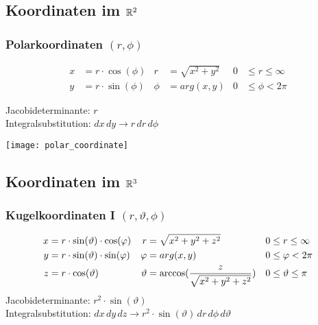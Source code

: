 \subsection{Koordinaten im $\R^2$}
\subsubsection{Polarkoordinaten $(r, \phi)$}
\begin{align*}
	x &= r \cdot \cos(\phi) &  r &= \sqrt{x^2 + y^2} & 0 &\leq r \leq \infty\\
	y &= r \cdot \sin(\phi) &  \phi &= arg(x, y) & 0 &\leq \phi < 2\pi
\end{align*}

\begin{minipage}{0.6\columnwidth}
	Jacobideterminante: $r$\\
	Integralsubstitution: $dx \, dy \to r \, dr \, d\phi$
\end{minipage}
\begin{minipage}{0.39\columnwidth}
	\texttt{[image: polar\_coordinate]}
\end{minipage}

\subsection{Koordinaten im $\R^3$}
\subsubsection{Kugelkoordinaten I $(r, \vartheta, \phi)$}
\begin{align*}
	x &= r \cdot \sin(\vartheta) \cdot \cos(\phi) & r &= \sqrt{x^2 + y^2 + z^2} & 0 &\leq r \leq \infty\\
	y &= r \cdot \sin(\vartheta) \cdot \sin(\phi) & \phi &= arg(x, y) & 0 &\leq \phi < 2\pi\\
	z &= r \cdot \cos(\vartheta) & \vartheta &= \arccos({\small \frac{z}{\sqrt{x^2 + y^2 + z^2}}}) & 0 &\leq \vartheta \leq \pi
\end{align*}
Jacobideterminante: $r^2 \cdot \sin(\vartheta)$\\
Integralsubstitution: $dx \, dy\, dz \to r^2 \cdot \sin(\vartheta) \, dr \, d\phi \, d\vartheta$

